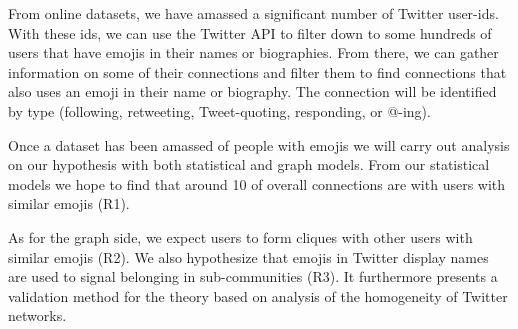 From online datasets, we have amassed a significant number of Twitter
user-ids. With these ids, we can use the Twitter API to filter down to
some hundreds of users that have emojis in their names or
biographies. From there, we can gather information on some of their
connections and filter them to find connections that also uses an
emoji in their name or biography. The connection will be identified by
type (following, retweeting, Tweet-quoting, responding, or @-ing).

Once a dataset has been amassed of people with emojis we will carry
out analysis on our hypothesis with both statistical and graph
models. From our statistical models we hope to find that around 10%
of overall connections are with users with similar emojis (R1).

As for the graph side, we expect users to form cliques with other
users with similar emojis (R2). We also hypothesize that emojis in
Twitter display names are used to signal belonging in sub-communities
(R3). It furthermore presents a validation method for the theory based
on analysis of the homogeneity of Twitter networks.
